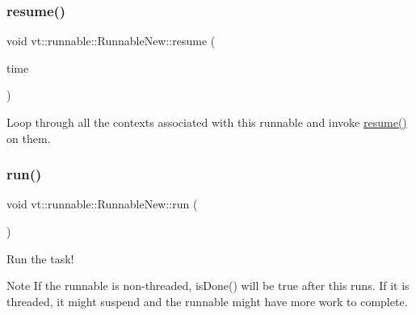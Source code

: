 \mbox{\label{structvt_1_1runnable_1_1_runnable_new_a6ee6d1cfc510876725cfb32e364c5ee9}} 
\subsubsection{\texorpdfstring{resume()}{resume()}}
{\footnotesize\ttfamily void vt\+::runnable\+::\+Runnable\+New\+::resume (\begin{DoxyParamCaption}\item[{\hyperlink{namespacevt_a2b9f28078dc309ad0706b69ded743e69}{Time\+Type}}]{time }\end{DoxyParamCaption})\hspace{0.3cm}{\ttfamily [private]}}



Loop through all the contexts associated with this runnable and invoke {\ttfamily \hyperlink{structvt_1_1runnable_1_1_runnable_new_a6ee6d1cfc510876725cfb32e364c5ee9}{resume()}} on them. 

\mbox{\label{structvt_1_1runnable_1_1_runnable_new_a3fa6c8ee2214c074c748000f782ad793}} 
\subsubsection{\texorpdfstring{run()}{run()}}
{\footnotesize\ttfamily void vt\+::runnable\+::\+Runnable\+New\+::run (\begin{DoxyParamCaption}{ }\end{DoxyParamCaption})}



Run the task! 

\begin{DoxyNote}{Note}
If the runnable is non-\/threaded, {\ttfamily is\+Done()} will be {\ttfamily true} after this runs. If it is threaded, it might suspend and the runnable might have more work to complete. 
\end{DoxyNote}
\mbox{\label{structvt_1_1runnable_1_1_runnable_new_a9bc943e7d924be528d2a0c02af3850c8}} 
